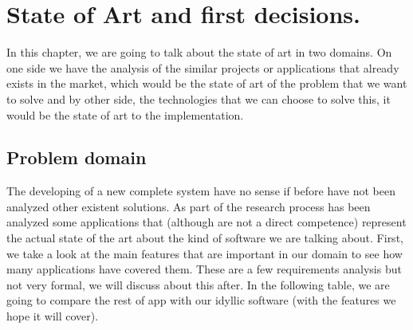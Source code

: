 \chapter{State of Art and first decisions. }

In this chapter, we are going to talk about the state of art in two domains.
On one side we have the analysis of the similar projects or applications that
already exists in the market, which would be the state of art of the problem
that we want to solve and by other side, the technologies that we can choose
to solve this, it would be the state of art to the implementation.

\section{Problem domain}

The developing of a new complete system have no sense if before have not been
analyzed other existent solutions. As part of the research process has been
analyzed some applications that (although are not a direct competence) represent
the actual state of the art about the kind of software we are talking about.
\intro
First, we take a look at the main features that are important in our domain
to see how many applications have covered them. These are a few requirements
analysis but not very formal, we will discuss about this after.
\intro
In the following table, we are going to compare the rest of app with our idyllic
software (with the features we hope it will cover).


